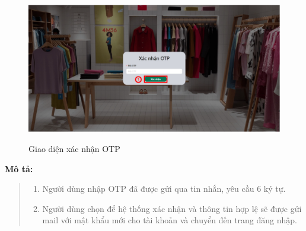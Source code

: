 \begin{figure}[!htp]
    \centering
    \includegraphics[width=5in]{img/UI/new_customer/confirm_otp.png}
    \label{4}
    \newline
    \caption{Giao diện xác nhận OTP}
\end{figure}
\textbf{Mô tả:}
\begin{quote}
    \begin{enumerate}
        \item Người dùng nhập OTP đã được gửi qua tin nhắn, yêu cầu 6 ký tự.
        \item Người dùng chọn để hệ thống xác nhận và thông tin hợp lệ sẽ được gửi mail với mật khẩu mới cho tài khoản và chuyển đến trang đăng nhập.
    \end{enumerate}
\end{quote}

